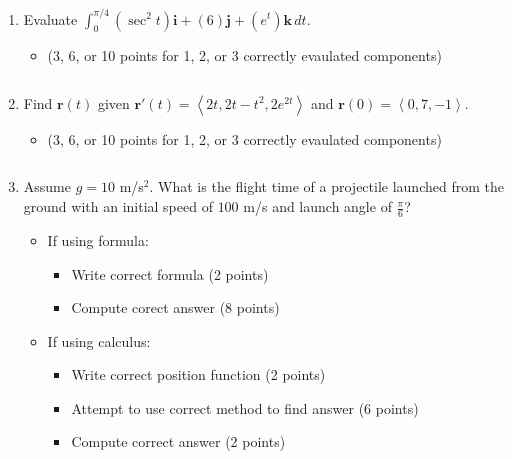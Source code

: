\documentclass[12pt]{article}
\newcommand{\up}{$~$\vspace*{-0.7in}}
\newcommand{\liner}{\noindent\underline{\hspace*{7in}}}
\newcommand{\ds}{\displaystyle}
\renewcommand{\vec}{\mathbf}
\newcommand{\<}{\left<}
\renewcommand{\>}{\right>}
\begin{document}
\begin{enumerate}

\item Evaluate $\ds \int_0^{\pi/4} (\sec^2 t)\vec{i}+(6)\vec{j}+\left(e^t\right)\vec{k} \, dt$.

  \begin{itemize}
    \item (3, 6, or 10 points for 1, 2, or 3 correctly evaulated components)
  \end{itemize}

\vspace*{8in}

\liner
\newpage\up


\item Find $\vec{r}(t)$ given $\vec{r}'(t) = \left<2t, 2t-t^2, 2e^{2t}\right>$ and $\vec{r}(0)=\left<0,7,-1\right>$.

  \begin{itemize}
    \item (3, 6, or 10 points for 1, 2, or 3 correctly evaulated components)
  \end{itemize}

\vspace*{8.3in}

\liner
\newpage\up


\item Assume $g=10$ m/s$^2$. What is the flight time of a projectile launched from the ground with an initial speed of $100$ m/s and launch angle of $\frac{\pi}{6}$?

  \begin{itemize}
    \item If using formula:
      \begin{itemize}
        \item Write correct formula (2 points)
        \item Compute corect answer (8 points)
      \end{itemize}
    \item If using calculus:
      \begin{itemize}
        \item Write correct position function (2 points)
        \item Attempt to use correct method to find answer (6 points)
        \item Compute correct answer (2 points)
      \end{itemize}
  \end{itemize}


\end{enumerate}
\end{document}
